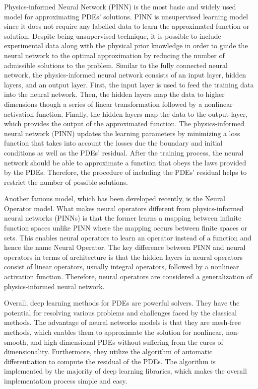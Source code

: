 \documentclass[a4paper, onecolumn, 12pt]{article}
\begin{document}
Physics-informed Neural Network (PINN) is the most basic and widely used model for approximating PDEs' solutions. 
PINN is unsupervised learning model since it does not require any 
labelled data to learn the approximated function or solution\cite{cuomo2022scientific}.
Despite being unsupervised technique, it is possible to include experimental data along with the physical prior knowledge
in order to guide the neural network to the optimal approximation by reducing the 
number of admissible solutions to the problem\cite{hao2022physics,raissi2019physics}.
Similar to the fully connected neural network, the physics-informed neural network consists of 
an input layer, hidden layers, and an output layer. First, the input layer is used to feed 
the training data into the neural network.  Then, the hidden layers map the data to higher dimensions though 
a series of linear transformation followed by a nonlinear activation function. 
Finally, the hidden layers map the data to the output layer, which provides the output of the approximated function. 
The physics-informed neural network (PINN) updates the learning parameters by minimizing a loss function that takes 
into account the losses due the boundary and initial conditions as well as the PDEs' residual. 
After the training process, the neural network should be able to approximate a function that obeys the laws provided by the PDEs. 
Therefore, the procedure of including the PDEs' residual helps to restrict the number of possible solutions. 

Another famous model, which has been developed recently, is the Neural Operator model. 
What makes neural operators different from physics-informed neural networks (PINNs) is that the former 
learns a mapping between infinite function spaces unlike PINN where the mapping occurs between finite spaces or sets. 
This enables neural operators to learn an operator instead of a function and hence the name Neural Operator.
The key difference between PINN and neural operators in terms of architecture is that the 
hidden layers in neural operators consist of linear operators, usually integral operators, 
followed by a nonlinear activation function. 
Therefore, neural operators are considered a generalization of physics-informed neural network.\cite{kovachki2021neural}

Overall, deep learning methods for PDEs are powerful solvers. 
They have the potential for resolving various problems and challenges faced by the classical methods. 
The advantage of neural networks models is that they are mesh-free methods, which enables them to approximate 
the solution for nonlinear, non-smooth, and high dimensional PDEs without suffering from the cures of dimensionality.
Furthermore, they utilize the algorithm of automatic differentiation to compute the residual of the PDEs. 
The algorithm is implemented by the majority of deep learning libraries, 
which makes the overall implementation process simple and easy. 
\end{document}
